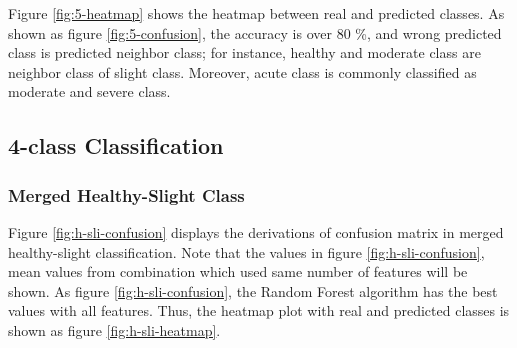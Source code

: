 \documentclass[aps, 11pt, a4paper]{article}
\begin{document}
    		Figure \ref{fig:5-heatmap} shows the heatmap between real and predicted classes. As shown as figure \ref{fig:5-confusion}, the accuracy is over 80 \%, and wrong predicted class is predicted neighbor class; for instance, healthy and moderate class are neighbor class of slight class. Moreover, acute class is commonly classified as moderate and severe class. 
    		
    	\subsection{4-class Classification}
    		\subsubsection{Merged Healthy-Slight Class}
    			Figure \ref{fig:h-sli-confusion} displays the derivations of confusion matrix in merged healthy-slight classification. Note that the values in figure \ref{fig:h-sli-confusion}, mean values from combination which used same number of features will be shown. As figure \ref{fig:h-sli-confusion}, the Random Forest algorithm has the best values with all features. Thus, the heatmap plot with real and predicted classes is shown as figure \ref{fig:h-sli-heatmap}.
    			
\end{document}
